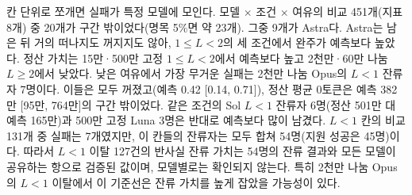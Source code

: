 칸 단위로 쪼개면 실패가 특정 모델에 모인다. 모델 $\times$ 조건 $\times$ 여유의 비교 451개(지표 8개) 중 20개가 구간 밖이었다(명목 5\%면 약 23개). 그중 9개가 Astra다. Astra는 남은 뒤 거의 떠나지도 꺼지지도 않아, $1\le L<2$의 세 조건에서 완주가 예측보다 높았다. 정산 가치는 15만·500만 고정 $1\le L<2$에서 예측보다 높고 2천만·60만 나눔 $L\ge 2$에서 낮았다. 낮은 여유에서 가장 무거운 실패는 2천만 나눔 Opus의 $L<1$ 잔류자 7명이다. 이들은 모두 꺼졌고(예측 0.42 [0.14, 0.71]), 정산 평균 0토큰은 예측 382만 [95만, 764만]의 구간 밖이었다. 같은 조건의 Sol $L<1$ 잔류자 6명(정산 501만 대 예측 165만)과 500만 고정 Luna 3명은 반대로 예측보다 많이 남겼다. $L<1$ 칸의 비교 131개 중 실패는 7개였지만, 이 칸들의 잔류자는 모두 합쳐 54명(지원 성공은 45명)이다. 따라서 $L<1$ 이탈 127건의 반사실 잔류 가치는 54명의 잔류 결과와 모든 모델이 공유하는 항으로 검증된 값이며, 모델별로는 확인되지 않는다. 특히 2천만 나눔 Opus의 $L<1$ 이탈에서 이 기준선은 잔류 가치를 높게 잡았을 가능성이 있다.

